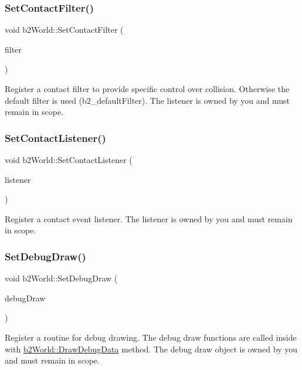 \subsubsection{\texorpdfstring{Set\+Contact\+Filter()}{SetContactFilter()}}
{\footnotesize\ttfamily void b2\+World\+::\+Set\+Contact\+Filter (\begin{DoxyParamCaption}\item[{\hyperlink{classb2_contact_filter}{b2\+Contact\+Filter} $\ast$}]{filter }\end{DoxyParamCaption})}

Register a contact filter to provide specific control over collision. Otherwise the default filter is used (b2\+\_\+default\+Filter). The listener is owned by you and must remain in scope. \mbox{\label{classb2_world_a614549967fb8a1584b61c11e2d553d42}} 
\subsubsection{\texorpdfstring{Set\+Contact\+Listener()}{SetContactListener()}}
{\footnotesize\ttfamily void b2\+World\+::\+Set\+Contact\+Listener (\begin{DoxyParamCaption}\item[{\hyperlink{classb2_contact_listener}{b2\+Contact\+Listener} $\ast$}]{listener }\end{DoxyParamCaption})}

Register a contact event listener. The listener is owned by you and must remain in scope. \mbox{\label{classb2_world_a6976d2c67400df03c0d44174ffcfb7ee}} 
\subsubsection{\texorpdfstring{Set\+Debug\+Draw()}{SetDebugDraw()}}
{\footnotesize\ttfamily void b2\+World\+::\+Set\+Debug\+Draw (\begin{DoxyParamCaption}\item[{\hyperlink{classb2_draw}{b2\+Draw} $\ast$}]{debug\+Draw }\end{DoxyParamCaption})}

Register a routine for debug drawing. The debug draw functions are called inside with \hyperlink{classb2_world_a293d9865e407fd463e168b0a29856acc}{b2\+World\+::\+Draw\+Debug\+Data} method. The debug draw object is owned by you and must remain in scope. \mbox{\label{classb2_world_ae377f2dd5512ada7d27f4ad3541c75bf}} 
